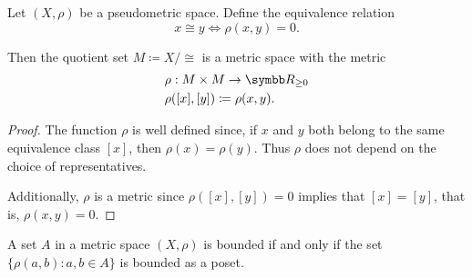 \begin{proposition}\label{thm:pseudometric_to_metric}
  Let \( (X, \rho) \) be a pseudometric space. Define the equivalence relation
  \begin{equation*}
    x \cong y \iff \rho(x, y) = 0.
  \end{equation*}

  Then the quotient set \( M \coloneqq X / \cong \) is a metric space with the metric
  \begin{align*}
    &\rho: M \times M \to \BR_{\geq 0} \\
    &\rho([x], [y]) \coloneqq \rho(x, y).
  \end{align*}
\end{proposition}
\begin{proof}
  The function \( \rho \) is well defined since, if \( x \) and \( y \) both belong to the same equivalence class \( [x] \), then \( \rho(x) = \rho(y) \). Thus \( \rho \) does not depend on the choice of representatives.

  Additionally, \( \rho \) is a metric since \( \rho([x], [y]) = 0 \) implies that \( [x] = [y] \), that is, \( \rho(x, y) = 0 \).
\end{proof}

\begin{proposition}\label{remark:bounded_set_metric_order_equivalence}
  A set \( A \) in a metric space \( (X, \rho) \) is bounded if and only if the set \( \{ \rho(a, b) \colon a, b \in A \} \) is bounded as a poset.
\end{proposition}

